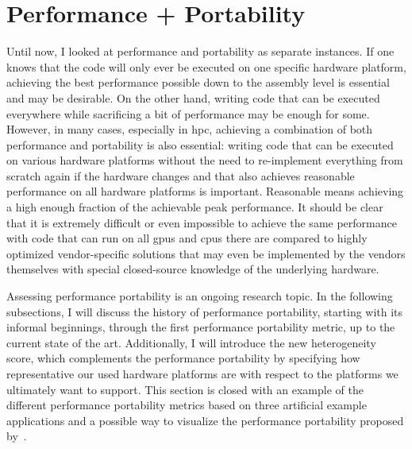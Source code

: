 \section{Performance + Portability}
\label{sec:pp}

Until now, I looked at performance and portability as separate instances. 
If one knows that the code will only ever be executed on one specific hardware platform, achieving the best performance possible down to the assembly level is essential and may be desirable. 
On the other hand, writing code that can be executed everywhere while sacrificing a bit of performance may be enough for some. 
However, in many cases, especially in \gls{hpc}, achieving a combination of both performance and portability is also essential: writing code that can be executed on various hardware platforms without the need to re-implement everything from scratch again if the hardware changes and that also achieves reasonable performance on all hardware platforms is important. 
Reasonable means achieving a high enough fraction of the achievable peak performance. 
It should be clear that it is extremely difficult or even impossible to achieve the same performance with code that can run on all \glspl{gpu} and \glspl{cpu} there are compared to highly optimized vendor-specific solutions that may even be implemented by the vendors themselves with special closed-source knowledge of the underlying hardware. 

Assessing performance portability is an ongoing research topic. 
In the following subsections, I will discuss the history of performance portability, starting with its informal beginnings, through the first performance portability metric, up to the current state of the art. 
Additionally, I will introduce the new heterogeneity score, which complements the performance portability by specifying how representative our used hardware platforms are with respect to the platforms we ultimately want to support. 
This section is closed with an example of the different performance portability metrics based on three artificial example applications and a possible way to visualize the performance portability proposed by~\citet{sewall_interpreting_2020}.








